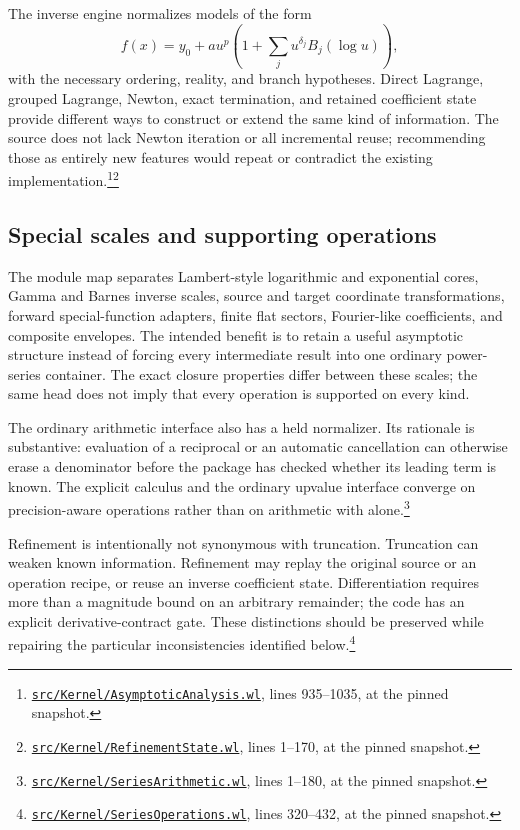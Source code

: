\documentclass[11pt,letterpaper]{article}
\newcommand{\code}[1]{\texttt{\detokenize{#1}}}
\newcommand{\sr}[3]{\footnote{\href{https://github.com/VladimirReshetnikov/Asymptotic/blob/6687962f3c858a4f93623cfc496f33e35c6763d4/#1\#L#2-L#3}{\nolinkurl{#1}}, lines #2--#3, at the pinned snapshot.}}
\begin{document}
The inverse engine normalizes models of the form
\begin{equation}\label{eq:inverse-model}
 f(x)=y_0+a u^p\left(1+\sum_j u^{\delta_j}B_j(\log u)\right),
\end{equation}
with the necessary ordering, reality, and branch hypotheses. Direct Lagrange, grouped Lagrange, Newton, exact termination, and retained coefficient state provide different ways to construct or extend the same kind of information. The source does not lack Newton iteration or all incremental reuse; recommending those as entirely new features would repeat or contradict the existing implementation.\sr{src/Kernel/AsymptoticAnalysis.wl}{935}{1035}\sr{src/Kernel/RefinementState.wl}{1}{170}

\subsection{Special scales and supporting operations}

The module map separates Lambert-style logarithmic and exponential cores, Gamma and Barnes inverse scales, source and target coordinate transformations, forward special-function adapters, finite flat sectors, Fourier-like coefficients, and composite envelopes. The intended benefit is to retain a useful asymptotic structure instead of forcing every intermediate result into one ordinary power-series container. The exact closure properties differ between these scales; the same head does not imply that every operation is supported on every kind.\cite{kernelmap,readme}

The ordinary arithmetic interface also has a held normalizer. Its rationale is substantive: evaluation of a reciprocal or an automatic cancellation can otherwise erase a denominator before the package has checked whether its leading term is known. The explicit calculus and the ordinary upvalue interface converge on precision-aware operations rather than on arithmetic with \code{Normal} alone.\sr{src/Kernel/SeriesArithmetic.wl}{1}{180}

Refinement is intentionally not synonymous with truncation. Truncation can weaken known information. Refinement may replay the original source or an operation recipe, or reuse an inverse coefficient state. Differentiation requires more than a magnitude bound on an arbitrary remainder; the code has an explicit derivative-contract gate. These distinctions should be preserved while repairing the particular inconsistencies identified below.\sr{src/Kernel/SeriesOperations.wl}{320}{432}
\end{document}
